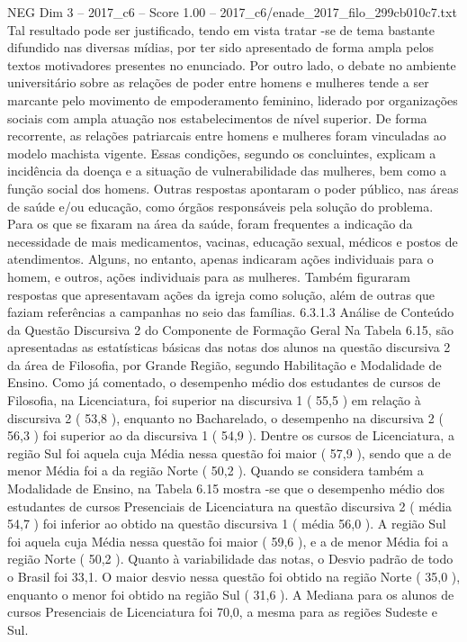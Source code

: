 \begin{textsample}{NEG Dim 3 – 2017\_c6 – Score 1.00 – 2017\_c6/enade\_2017\_filo\_299cb010c7.txt}
Tal resultado pode ser justificado, tendo em vista tratar -se de tema bastante difundido nas diversas mídias, por ter sido apresentado de forma ampla pelos textos motivadores presentes no enunciado.
Por outro lado, o debate no ambiente universitário sobre as relações de poder entre homens e mulheres tende a ser marcante pelo movimento de empoderamento feminino, liderado por organizações sociais com ampla atuação nos estabelecimentos de nível superior.
De forma recorrente, as relações patriarcais entre homens e mulheres foram vinculadas ao modelo machista vigente.
Essas condições, segundo os concluintes, explicam a incidência da doença e a situação de vulnerabilidade das mulheres, bem como a função social dos homens.
Outras respostas apontaram o poder público, nas áreas de saúde e/ou educação, como órgãos responsáveis pela solução do problema.
Para os que se fixaram na área da saúde, foram frequentes a indicação da necessidade de mais medicamentos, vacinas, educação sexual, médicos e postos de atendimentos.
Alguns, no entanto, apenas indicaram ações individuais para o homem, e outros, ações individuais para as mulheres.
Também figuraram respostas que apresentavam ações da igreja como solução, além de outras que faziam referências a campanhas no seio das famílias. 6.3.1.3 Análise de Conteúdo da Questão Discursiva 2 do Componente de Formação Geral Na Tabela 6.15, são apresentadas as estatísticas básicas das notas dos alunos na questão discursiva 2 da área de Filosofia, por Grande Região, segundo Habilitação e Modalidade de Ensino.
Como já comentado, o desempenho médio dos estudantes de cursos de Filosofia, na Licenciatura, foi superior na discursiva 1 ( 55,5 ) em relação à discursiva 2 ( 53,8 ), enquanto no Bacharelado, o desempenho na discursiva 2 ( 56,3 ) foi superior ao da discursiva 1 ( 54,9 ).
Dentre os cursos de Licenciatura, a região Sul foi aquela cuja Média nessa questão foi maior ( 57,9 ), sendo que a de menor Média foi a da região Norte ( 50,2 ).
Quando se considera também a Modalidade de Ensino, na Tabela 6.15 mostra -se que o desempenho médio dos estudantes de cursos Presenciais de Licenciatura na questão discursiva 2 ( média 54,7 ) foi inferior ao obtido na questão discursiva 1 ( média 56,0 ).
A região Sul foi aquela cuja Média nessa questão foi maior ( 59,6 ), e a de menor Média foi a região Norte ( 50,2 ).
Quanto à variabilidade das notas, o Desvio padrão de todo o Brasil foi 33,1.
O maior desvio nessa questão foi obtido na região Norte ( 35,0 ), enquanto o menor foi obtido na região Sul ( 31,6 ).
A Mediana para os alunos de cursos Presenciais de Licenciatura foi 70,0, a mesma para as regiões Sudeste e Sul.

\end{textsample}
